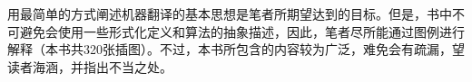 \begin{spacing}{1.18}
{\red 用最简单的方式阐述机器翻译的基本思想}是笔者所期望达到的目标。但是，书中不可避免会使用一些形式化定义和算法的抽象描述，因此，笔者尽所能通过图例进行解释（本书共320张插图）。不过，本书所包含的内容较为广泛，难免会有疏漏，望读者海涵，并指出不当之处。

\begin{figure}[htp]
\centering
\centering

\end{figure}

\end{spacing}








